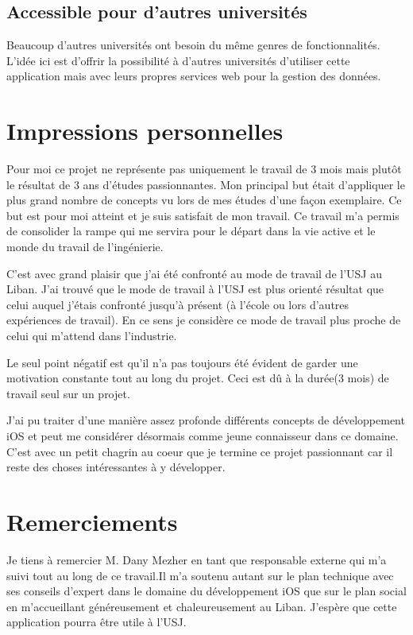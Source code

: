\documentclass[12pt,a4paper,twoside]{report}
\begin{document}
\subsection{Accessible pour d'autres universités}
Beaucoup d'autres universités ont besoin du même genres de fonctionnalités. L'idée ici est d'offrir la possibilité à d'autres universités d'utiliser cette application mais avec leurs propres services web pour la gestion des données.

\section{Impressions personnelles} 
Pour moi ce projet ne représente pas uniquement le travail de 3 mois mais plutôt le résultat de 3 ans d'études passionnantes. Mon principal but était d'appliquer le plus grand nombre de concepts vu lors de mes études d'une façon exemplaire. Ce but est pour moi atteint et je suis satisfait de mon travail.  Ce travail m'a permis de consolider la rampe qui me servira pour le départ dans la vie active et le monde du travail de l'ingénierie.  
   
C'est avec grand plaisir que j'ai été confronté au mode de travail de l'USJ au Liban. J'ai trouvé que le mode de travail à l'USJ est plus orienté résultat que celui auquel j'étais confronté jusqu'à présent (à l'école ou lors d'autres expériences de travail). En ce sens je considère ce mode de travail plus proche de celui qui m'attend dans l'industrie. 

Le seul point négatif est qu'il n'a pas toujours été évident de garder une motivation constante tout au long du projet. Ceci est dû à la durée(3 mois) de travail seul sur un projet.

J'ai pu traiter d'une manière assez profonde différents concepts de développement iOS et peut me considérer désormais comme jeune connaisseur dans ce domaine.
C'est avec un petit chagrin au coeur que je termine ce projet passionnant  car il reste des choses intéressantes à y développer. 

\section{Remerciements}
Je tiens à remercier M. Dany Mezher  en tant que responsable externe qui m'a suivi tout au long de ce travail.Il m'a soutenu autant sur le plan technique avec ses conseils d'expert dans le domaine du développement iOS que sur le plan social en m'accueillant généreusement et chaleureusement au Liban. J'espère que cette application pourra être utile à l'USJ. 
\end{document}
